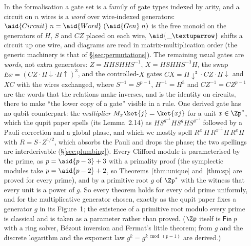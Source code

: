 In the formalisation a gate set is a family of gate types indexed by
arity, and a circuit on $n$ wires is a \emph{word} over wire-indexed
generators: $\aid{Circuit}\;n = \aid{Word}\;(\aid{Gen}\;n)$ is the free
monoid on the generators of $H$, $S$ and $CZ$ placed on each wire,
$\aid{{\_}↑}$ shifts a circuit up one wire, and diagrams are read in
matrix-multiplication order (the generic machinery is that of
\S\ref{sec:permutations}).  The remaining usual gates are \emph{words}, not extra
generators: $Z = H H S H H S^{-1}$, $X = H S H H S^{-1} H$, the swap
$\mathit{Ex} = (CZ \cdot H{\downarrow} \cdot H{\uparrow})^{3}$, and the
controlled-$X$ gates $CX = H{\downarrow}^{3} \cdot CZ \cdot
H{\downarrow}$ and $XC$ with the wires exchanged, where $S^{-1} =
S^{p-1}$, $H^{-1} = H^{3}$ and $CZ^{-1} = CZ^{p-1}$ are the words that
the relations make inverses, and  is the identity on
circuits, there to make ``the lower copy of a gate'' visible in a rule.
One derived gate has no qubit counterpart: the \emph{multiplier}
$M_x\ket{j} = \ket{xj}$ for a unit $x \in \Zp^{*}$, which the qupit
paper spells (its Lemma~2.14) as $H S^{g^{-1}} H S^{g} H S^{g^{-1}}$
followed by a Pauli correction and a global phase, and which we mostly
spell $R^{x}\,H\,R^{x^{-1}}H\,R^{x}H$ with $R = S\cdot Z^{1/2}$, which
absorbs the Pauli and drops the phase; the two spellings are
interderivable (\S\ref{sec:plumbing}).  Every Clifford module is
parameterised by the prime, as $p = \aid{p-3} + 3$ with a primality
proof (the symplectic modules take $p = \aid{p-2} + 2$, so
Theorems~\ref{thm:unique} and~\ref{thm:sp} are proved for every prime),
and by a primitive root $g$ of $\Zp^{*}$ with the witness 
that every unit is a power of $g$.  So every theorem holds for every odd
prime uniformly, and for the multiplicative generator chosen, exactly as
the qupit paper fixes a generator $g$ in its Figure~1; the existence of
a primitive root modulo every prime is classical and is taken as a
parameter rather than proved.  ($\Zp$ itself is $\mathsf{Fin}\;p$ with
a ring solver, B\'ezout inversion and Fermat's little theorem; from $g$
and  the discrete logarithm and the exponent law $g^{k} =
g^{k \bmod (p-1)}$ are derived.)

